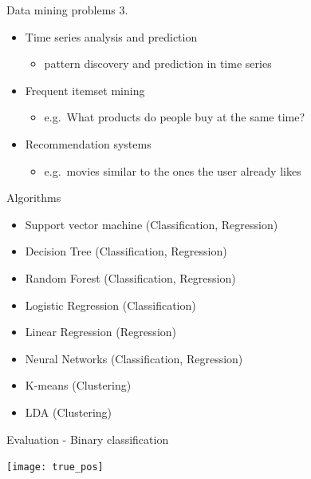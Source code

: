 \documentclass[bigger]{beamer}
\begin{document}
\begin{frame}{Data mining problems 3.}
    \begin{itemize}
        \item Time series analysis and prediction
            \begin{itemize}
                \item pattern discovery and prediction in time series
            \end{itemize}
        \item Frequent itemset mining
            \begin{itemize}
                \item e.g.~What products do people buy at the same time?
            \end{itemize}
        \item Recommendation systems
            \begin{itemize}
                \item e.g.~movies similar to the ones the user already likes
            \end{itemize}
    \end{itemize}
\end{frame}

\begin{frame}{Algorithms}
	\begin{itemize}
		\item Support vector machine (Classification, Regression)
		\item Decision Tree (Classification, Regression)
		\item Random Forest (Classification, Regression)
		\item Logistic Regression (Classification)
		\item Linear Regression (Regression)
		\item Neural Networks (Classification, Regression)
		\item K-means (Clustering)
		\item LDA (Clustering)
	\end{itemize}
\end{frame}

\begin{frame}{Evaluation - Binary classification}
    \begin{center}
\texttt{[image: true\_pos]}
    \end{center}
\end{frame}
\end{document}
